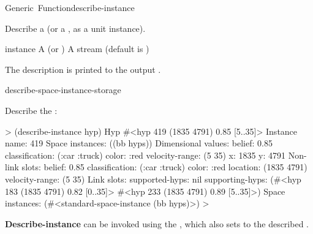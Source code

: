 \documentclass[10pt,twoside,english,pdftex]{article}
\begin{document}
\begin{functiondoc}{Generic~Function}{describe-instance}%
  {}
%
%
%

\fnsyntax

\fnpurpose Describe a  (or a
, as a unit instance).

\fnmethods
{}%
 {\code{(} 
    }

\fnpackage {}

\fnmodule {}

%
\fnargs
\begin{args}{instance}
\arg[instance] A  (or )
\arg[stream] A stream (default is )
\end{args}

\fndescription
The description is printed to the output .

\begin{alsos}{describe-space-instance-storage}
\end{alsos}

\fnexample
Describe the  :
%
\W\supp
\begin{example}
  > (describe-instance hyp)
  Hyp #<hyp 419 (1835 4791) 0.85 [5..35]>
    Instance name: 419
    Space instances: ((bb hyps))
    Dimensional values:
      belief:  0.85
      classification:  (:car :truck)
      color:  :red
      velocity-range:  (5 35)
      x:  1835
      y:  4791
    Non-link slots:
      belief:  0.85
      classification:  (:car :truck)
      color:  :red
      location:  (1835 4791)
      velocity-range:  (5 35)
    Link slots:
      supported-hyps:  nil
      supporting-hyps:  (#<hyp 183 (1835 4791) 0.82 [0..35]>
                         #<hyp 233 (1835 4791) 0.89 [5..35]>)
    Space instances: (#<standard-space-instance (bb hyps)>)
  >
\end{example}

\replnote 
%
%
%
\textbf{Describe-instance} can be invoked using the 
, which also sets \code{=} to the described .

\end{functiondoc}
\end{document}
